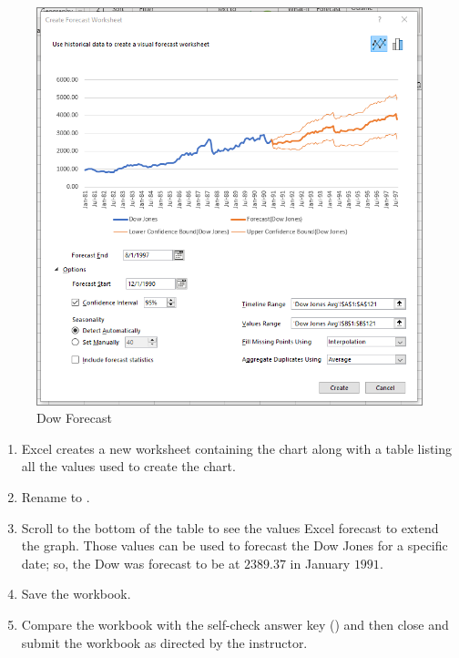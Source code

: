 \begin{figure}[H]
	\centering
	\includegraphics[width=\maxwidth{.95\linewidth}]{gfx/ch08_fig12}
	\caption{Dow Forecast}
	\label{08:fig12}
\end{figure}

\begin{enumerate}[resume]
	\item Excel creates a new worksheet containing the chart along with a table listing all the values used to create the chart.
	\item Rename  to .
	\item Scroll to the bottom of the table to see the values Excel forecast to extend the graph. Those values can be used to forecast the Dow Jones for a specific date; so, the Dow was forecast to be at $ 2389.37 $ in January $ 1991 $.
	
	\item Save the  workbook.
	\item Compare the workbook with the self-check answer key () and then close and submit the  workbook as directed by the instructor.

\end{enumerate}

